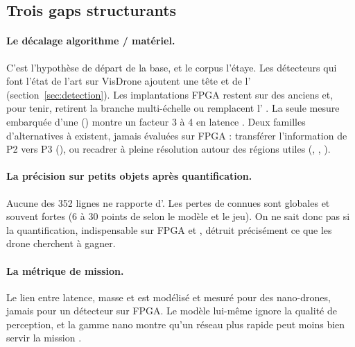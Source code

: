 \subsection{Trois gaps structurants}

\paragraph{Le décalage algorithme / matériel.} C'est l'hypothèse de départ de la base, et
le corpus l'étaye. Les détecteurs qui font l'état de l'art sur VisDrone ajoutent une tête
 et de l' (section~\ref{sec:detection}). Les implantations FPGA restent sur des
 anciens et, pour tenir, retirent la branche multi-échelle
\citep{2025-cali-optimized-implementation-yolov3-tiny-real} ou remplacent l'
\citep{arxiv-2607.13106-no-attention-no-problem-dpu}\pp. La seule mesure embarquée d'une
 () montre un facteur 3 à 4 en latence
\citep[Table~6]{2023-zhang-drone-yolo-efficient-neural-network}. Deux familles
d'alternatives à  existent, jamais évaluées sur FPGA : transférer l'information de P2
vers P3 (), ou recadrer à pleine résolution autour des régions utiles (,
, ).

\paragraph{La précision sur petits objets après quantification.} Aucune des 352 lignes ne
rapporte d'. Les pertes de  connues sont globales et souvent fortes
(6 à 30 points de  selon le modèle et le jeu). On ne sait donc pas si la
quantification, indispensable sur FPGA et , détruit précisément ce que les  drone
cherchent à gagner.

\paragraph{La métrique de mission.} Le lien entre latence, masse et  est
modélisé \citep{arxiv-2204.10898-roofline-model-uavs-bottleneck-analysis}\pp{} et mesuré
pour des nano-drones, jamais pour un détecteur sur FPGA. Le modèle lui-même ignore la
qualité de perception, et la gamme nano montre qu'un réseau plus rapide peut moins bien
servir la mission \citep[Table~IV]{arxiv-2103.10873-fully-onboard-ai-powered-human}\pp.

